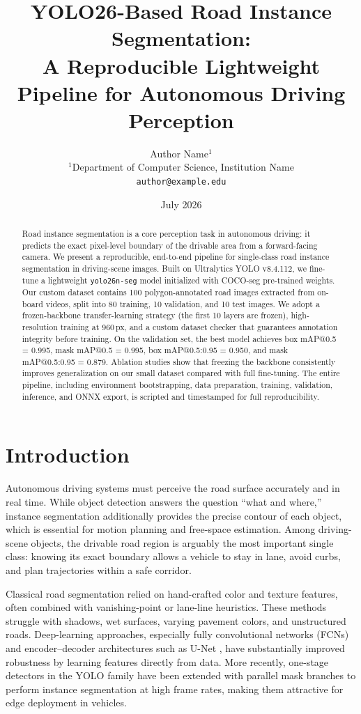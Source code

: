 \documentclass[11pt,a4paper]{article}
\title{\textbf{YOLO26-Based Road Instance Segmentation:\\A Reproducible Lightweight Pipeline for Autonomous Driving Perception}}
\author{Author Name$^{1}$ \\ $^{1}$Department of Computer Science, Institution Name \\ \texttt{author@example.edu}}
\date{July 2026}
\newcommand{\tool}[1]{\texttt{#1}}
\newcommand{\modelname}{\tool{yolo26n-seg}}
\begin{document}
\maketitle

\begin{abstract}
Road instance segmentation is a core perception task in autonomous driving: it predicts the exact pixel-level boundary of the drivable area from a forward-facing camera. We present a reproducible, end-to-end pipeline for single-class road instance segmentation in driving-scene images. Built on Ultralytics YOLO v8.4.112, we fine-tune a lightweight \modelname{} model initialized with COCO-seg pre-trained weights. Our custom dataset contains 100 polygon-annotated road images extracted from on-board videos, split into 80 training, 10 validation, and 10 test images. We adopt a frozen-backbone transfer-learning strategy (the first 10 layers are frozen), high-resolution training at 960\,px, and a custom dataset checker that guarantees annotation integrity before training. On the validation set, the best model achieves box mAP@0.5 = 0.995, mask mAP@0.5 = 0.995, box mAP@0.5:0.95 = 0.950, and mask mAP@0.5:0.95 = 0.879. Ablation studies show that freezing the backbone consistently improves generalization on our small dataset compared with full fine-tuning. The entire pipeline, including environment bootstrapping, data preparation, training, validation, inference, and ONNX export, is scripted and timestamped for full reproducibility.
\end{abstract}

\section{Introduction}\label{sec:intro}

Autonomous driving systems must perceive the road surface accurately and in real time. While object detection answers the question ``what and where,'' instance segmentation additionally provides the precise contour of each object, which is essential for motion planning and free-space estimation. Among driving-scene objects, the drivable road region is arguably the most important single class: knowing its exact boundary allows a vehicle to stay in lane, avoid curbs, and plan trajectories within a safe corridor.

Classical road segmentation relied on hand-crafted color and texture features, often combined with vanishing-point or lane-line heuristics. These methods struggle with shadows, wet surfaces, varying pavement colors, and unstructured roads. Deep-learning approaches, especially fully convolutional networks (FCNs) \cite{Long2015FCN} and encoder--decoder architectures such as U-Net \cite{Ronneberger2015UNet}, have substantially improved robustness by learning features directly from data. More recently, one-stage detectors in the YOLO family \cite{Redmon2018YOLOv3,Bochkovskiy2020YOLOv4,Jocher2023Ultralytics} have been extended with parallel mask branches to perform instance segmentation at high frame rates, making them attractive for edge deployment in vehicles.
\end{document}
